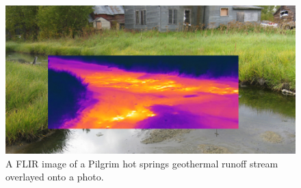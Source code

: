 \begin{figure}[h]
	\centering
	
	\includegraphics[width=\textwidth]{figures/PilgrimFLIR.png} 

	\caption{A FLIR image of a Pilgrim hot springs geothermal runoff stream overlayed onto a photo.}
	\label{fig:pilgrimFLIR}


\end{figure}